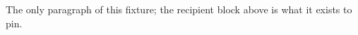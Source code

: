 \documentclass{careerdossier-letter}
\begin{document}
\MakeCDossierLetterhead
The only paragraph of this fixture; the recipient block above is what it exists
to pin.
\MakeCDossierClosing
\end{document}
